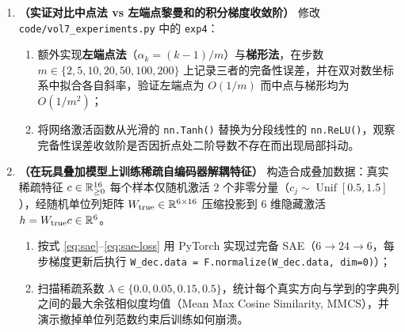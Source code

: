\begin{enumerate}[label=\textbf{7.4.\arabic*}, start=5]
  \item \textbf{（实证对比中点法 vs 左端点黎曼和的积分梯度收敛阶）} 修改 \texttt{code/vol7\_experiments.py} 中的 \texttt{exp4}：
  \begin{enumerate}
    \item 额外实现\textbf{左端点法}（$\alpha_k = (k-1)/m$）与\textbf{梯形法}，在步数 $m \in \{2, 5, 10, 20, 50, 100, 200\}$ 上记录三者的完备性误差，并在双对数坐标系中拟合各自斜率，验证左端点为 $O(1/m)$ 而中点与梯形均为 $O(1/m^2)$；
    \item 将网络激活函数从光滑的 \texttt{nn.Tanh()} 替换为分段线性的 \texttt{nn.ReLU()}，观察完备性误差收敛阶是否因折点处二阶导数不存在而出现局部抖动。
  \end{enumerate}

  \item \textbf{（在玩具叠加模型上训练稀疏自编码器解耦特征）} 构造合成叠加数据：真实稀疏特征 $c \in \mathbb{R}_{\ge 0}^{16}$ 每个样本仅随机激活 $2$ 个非零分量（$c_j \sim \operatorname{Unif}[0.5, 1.5]$），经随机单位列矩阵 $W_{\text{true}} \in \mathbb{R}^{6 \times 16}$ 压缩投影到 $6$ 维隐藏激活 $h = W_{\text{true}} c \in \mathbb{R}^6$。
  \begin{enumerate}
    \item 按式 \eqref{eq:sae}--\eqref{eq:sae-loss} 用 PyTorch 实现过完备 SAE（$6 \to 24 \to 6$，每步梯度更新后执行 \texttt{W\_dec.data = F.normalize(W\_dec.data, dim=0)}）；
    \item 扫描稀疏系数 $\lambda \in \{0.0, 0.05, 0.15, 0.5\}$，统计每个真实方向与学到的字典列之间的最大余弦相似度均值（Mean Max Cosine Similarity, MMCS），并演示撤掉单位列范数约束后训练如何崩溃。
  \end{enumerate}
\end{enumerate}


